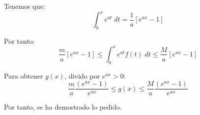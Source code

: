 \documentclass[12pt]{article}
\begin{document}
\begin{ejercicio}
\begin{enumerate}
        Tenemos que:
        \begin{equation*}
            \int_0^x e^{at}\;dt = \frac{1}{a}\left[e^{ax}-1\right]
        \end{equation*}

        Por tanto:
        \begin{equation*}
            \frac{m}{a}\left[e^{ax}-1\right] \leq \int_0^x e^{at}f(t)\;dt\leq \frac{M}{a}\left[e^{ax}-1\right]
        \end{equation*}

        Para obtener $g(x)$, divido por $e^{ax}>0$:
        \begin{equation*}
            \frac{m}{a}\frac{(e^{ax}-1)}{e^{ax}} \leq g(x)\leq \frac{M}{a}\frac{(e^{ax}-1)}{e^{ax}}
        \end{equation*}

        Por tanto, se ha demostrado lo pedido.
    \end{enumerate}
\end{ejercicio}
\end{document}
